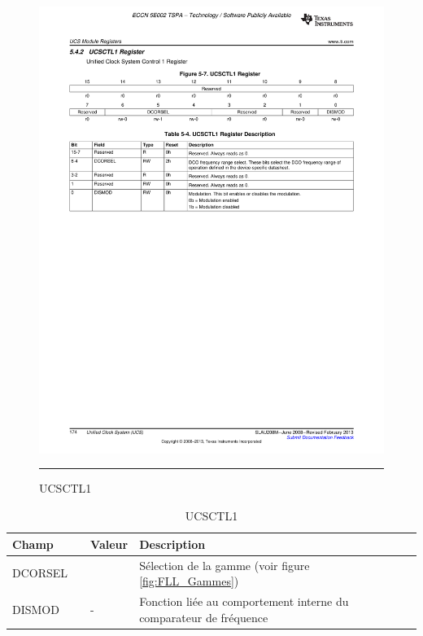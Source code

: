 \pagebreak
\begin{figure}[H]
  \centering
  \includegraphics [angle=0, width=16cm]{./Figures/Chap6_Horloges/UCSCTL1.pdf}
  \rule{35em}{0.5pt}
  \caption{UCSCTL1}
  \label{fig:UCSCTL1}
\end{figure}

\begin{table}[H]
\centering 
\begin{tabular}{l l l l}
\hline\hline
Champ & & Valeur & Description \\ %
\hline
DCORSEL & & & Sélection de la gamme (voir figure \ref{fig:FLL_Gammes})  \\
\hline
DISMOD & & - & Fonction liée au comportement interne du comparateur de fréquence \\
\hline
\end{tabular}
\caption{UCSCTL1}
\label{table:UCSCTL1}
\end{table}

